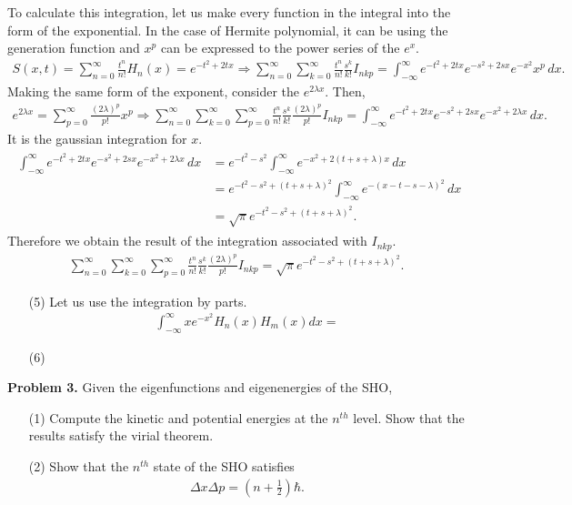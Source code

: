 \documentclass[floatfix,nofootinbib,superscriptaddress,fleqn]{revtex4-2}
\begin{document}
To calculate this integration, let us make every function 
in the integral into the form of the exponential.
In the case of Hermite polynomial, it can be using the generation function
and $x^p$ can be expressed to the power series of the $e^x$.
\begin{align}
  S(x,t) = \sum_{n=0}^\infty \frac{t^n}{n!}H_n(x)=e^{-t^2+2tx}
  \Longrightarrow \sum_{n=0}^\infty\sum_{k=0}^\infty \frac{t^n}{n!}\frac{s^k}{k!}
  I_{nkp}
  = \int^{\infty}_{-\infty}e^{-t^2+2tx}e^{-s^2+2sx}e^{-x^2}x^p\,dx.
\end{align}
Making the same form of the exponent, consider the $e^{2\lambda x}$. Then,
\begin{align}
  e^{2\lambda x} = \sum_{p=0}^{\infty}\frac{(2\lambda)^p}{p!}x^p
  \Longrightarrow \sum_{n=0}^\infty\sum_{k=0}^\infty\sum_{p=0}^{\infty}
  \frac{t^n}{n!}\frac{s^k}{k!}\frac{(2\lambda)^p}{p!}
  I_{nkp}
  = \int^{\infty}_{-\infty}e^{-t^2+2tx}e^{-s^2+2sx}e^{-x^2+2\lambda x}\,dx.
\end{align}
It is the gaussian integration for $x$.
\begin{align}
  \begin{split}
    \int^{\infty}_{-\infty}e^{-t^2+2tx}e^{-s^2+2sx}e^{-x^2+2\lambda x}\,dx
    &=e^{-t^2-s^2}\int^{\infty}_{-\infty}e^{-x^2+2(t+s+\lambda) x}\,dx \\
    &=e^{-t^2-s^2+(t+s+\lambda)^2}\int^{\infty}_{-\infty}e^{-(x-t-s-\lambda)^2}\,dx \\
    &=\sqrt{\pi}e^{-t^2-s^2+(t+s+\lambda)^2}.
  \end{split}
\end{align}
Therefore we obtain the result of the integration associated with $I_{nkp}$.
\begin{align}
  \sum_{n=0}^\infty\sum_{k=0}^\infty\sum_{p=0}^{\infty}
  \frac{t^n}{n!}\frac{s^k}{k!}\frac{(2\lambda)^p}{p!}
  I_{nkp}
  =\sqrt{\pi}e^{-t^2-s^2+(t+s+\lambda)^2}.
\end{align}
\begin{itemize}
  \item[(5)] Let us use the integration by parts.
  \begin{align}
    \int_{-\infty}^\infty x e^{-x^2} H_n(x) H_m(x) dx 
    = 
  \end{align}
  \item[(6)] 
\end{itemize}
\vspace{0.5cm}

\noindent \textbf{Problem 3.} 
Given the eigenfunctions and eigenenergies of the SHO, 
\begin{itemize}
\item[(1)] Compute the kinetic and potential energies at the $n^{th}$
  level.  Show that the results satisfy the virial theorem. 
\item[(2)] Show that the $n^{th}$ state of the SHO satisfies 
  \begin{align}
    \Delta x \Delta p = \left(n+\frac12\right)\hbar.
  \end{align}
\end{itemize}
\end{document}
